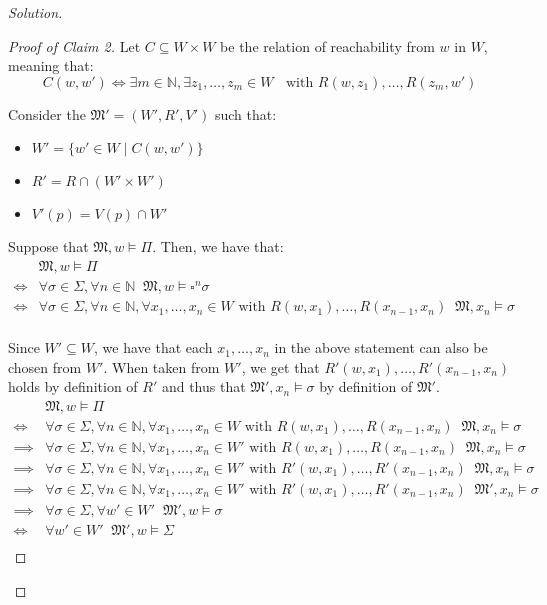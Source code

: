 \documentclass[12pt,a4paper]{report}
\theoremstyle{definition}
\newcommand{\N}{\mathbb{N}}                     %
\newcommand{\model}[1]{\mathfrak{#1}}           %
\begin{document}
\begin{proof}[Solution]
\begin{proof}[Proof of Claim 2]
            Let $C \subseteq W \times W$ be the relation of reachability from $w$ in $W$, meaning that:
            \[C(w,w') \iff \exists m \in \N, \exists z_1, \ldots, z_{m} \in W \;\; \text{ with } R(w, z_1), \ldots, R(z_{m}, w')\]

            Consider the $\model{M}' = (W', R', V')$ such that:
            \begin{itemize}
                \item $W' = \{w' \in W \mid C(w,w')\}$
                \item $R' = R \cap (W' \times W')$
                \item $V'(p) = V(p) \cap W'$
            \end{itemize}

            Suppose that $\model M, w \models \Pi$. Then, we have that:
            \[\begin{split}
                & \model M, w \models \Pi \\
                \iff & \forall \sigma \in \Sigma, \forall n \in \N \;\; \model M, w \models \square^n \sigma \\
                \iff & \forall \sigma \in \Sigma, \forall n \in \N, \forall x_1, \ldots, x_n \in W  \text{ with } R(w, x_1), \ldots, R(x_{n-1}, x_n)\;\; \model M, x_n \models \sigma \\
            \end{split}\]

            Since $W' \subseteq W$, we have that each $x_1, \ldots, x_n$ in the above statement can also be chosen from $W'$. When taken from $W'$, we get that $R'(w, x_1), \ldots, R'(x_{n-1}, x_n)$ holds by definition of $R'$ and thus that $\model M', x_n \models \sigma$ by definition of $\model M'$.
            \[\begin{split}
                & \model M, w \models \Pi \\
                \iff & \forall \sigma \in \Sigma, \forall n \in \N, \forall x_1, \ldots, x_n \in W  \text{ with } R(w, x_1), \ldots, R(x_{n-1}, x_n)\;\; \model M, x_n \models \sigma \\
                \implies & \forall \sigma \in \Sigma, \forall n \in \N, \forall x_1, \ldots, x_n \in W'  \text{ with } R(w, x_1), \ldots, R(x_{n-1}, x_n)\;\; \model M, x_n \models \sigma \\
                \implies & \forall \sigma \in \Sigma, \forall n \in \N, \forall x_1, \ldots, x_n \in W'  \text{ with } R'(w, x_1), \ldots, R'(x_{n-1}, x_n)\;\; \model M, x_n \models \sigma \\
                \implies & \forall \sigma \in \Sigma, \forall n \in \N, \forall x_1, \ldots, x_n \in W'  \text{ with } R'(w, x_1), \ldots, R'(x_{n-1}, x_n)\;\; \model M', x_n \models \sigma \\
                \implies & \forall \sigma \in \Sigma, \forall w' \in W' \;\; \model M', w \models \sigma \\
                \iff & \forall w' \in W' \;\; \model M', w \models \Sigma \\
            \end{split}\]


\end{proof}
\end{proof}
\end{document}
